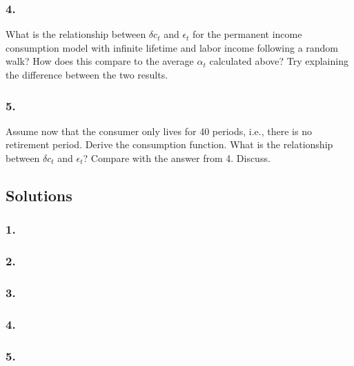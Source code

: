 \documentclass[10pt, a4paper]{article}
\begin{document}
    \subsubsection*{4.}
      What is the relationship between $\delta c_t$ and $\epsilon_t$ for the permanent income consumption model with infinite lifetime and labor income following a random walk? How does this compare to the average $\alpha_t$ calculated above? Try explaining the difference between the two results.
    \subsubsection*{5.}
      Assume now that the consumer only lives for 40 periods, i.e., there is no retirement period. Derive the consumption function. What is the relationship between $\delta c_t$ and $\epsilon_t$? Compare with the answer from 4. Discuss.
  \subsection*{Solutions}
    \subsubsection*{1.}
    \subsubsection*{2.}
    \subsubsection*{3.}
    \subsubsection*{4.}
    \subsubsection*{5.}
\end{document}
